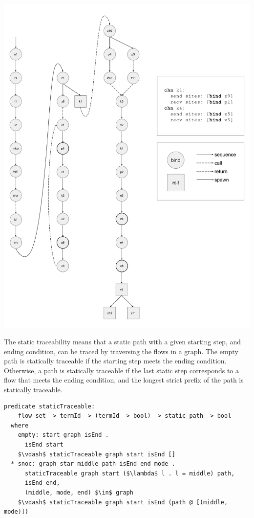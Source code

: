 \documentclass[letterpaper, 11pt]{extarticle}
\begin{document}
\includegraphics[width=.9\textwidth]{cml-graph.pdf}

The static traceability means that a static path with a given starting step, and ending
condition, can be traced by traversing the flows in a graph.
The empty path is statically traceable if the starting step meets the ending condition.
Otherwise, a path is statically traceable if the last static step corresponds to a flow
that meets the ending condition, and the longest strict prefix of the path is statically
traceable.  

\begin{lstlisting}[language=logic, mathescape]
  predicate staticTraceable:
    flow set -> termId -> (termId -> bool) -> static_path -> bool
  where
    empty: start graph isEnd .
      isEnd start
    $\vdash$ staticTraceable graph start isEnd []
  * snoc: graph star middle path isEnd end mode .
      staticTraceable graph start ($\lambda$ l . l = middle) path, 
      isEnd end, 
      (middle, mode, end) $\in$ graph 
    $\vdash$ staticTraceable graph start isEnd (path @ [(middle, mode)])
\end{lstlisting}
\end{document}

